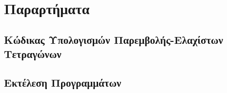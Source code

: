 \documentclass[assignment3.tex]{subfiles}
\begin{document}
\section*{Παραρτήματα}
\subsection*{Κώδικας Υπολογισμών Παρεμβολής-Ελαχίστων Τετραγώνων}


\subsection*{Εκτέλεση Προγραμμάτων}
%
\end{document}
